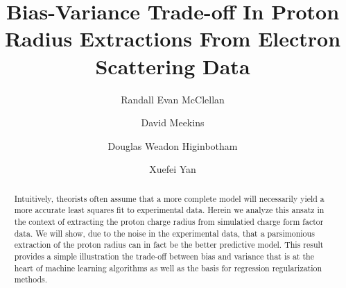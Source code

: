 \documentclass[10pt,aps,prc,twocolumn]{revtex4-1}
\begin{document}
\title{Bias-Variance Trade-off In Proton Radius Extractions From Electron Scattering Data} 

\author{Randall Evan McClellan}
\author{David Meekins} 
\author{Douglas Weadon Higinbotham}
\author{Xuefei Yan}

\begin{abstract}
Intuitively, theorists often assume that a more complete model will necessarily yield a more 
accurate least squares fit to experimental data.   Herein we analyze this ansatz in the context of extracting 
the proton charge radius from simulatied charge form factor data.
We will show, due to the noise in the experimental data,
that a parsimonious extraction of the proton radius can in fact be the better predictive model.  This result 
provides a simple illustration the trade-off between bias and variance that is at the
heart of machine learning algorithms as well as the basis for regression regularization methods.

\end{abstract}

%
%
%
%
%
%
%
%
%
%
%
\end{document}
